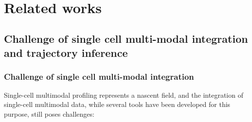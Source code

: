 \section{Related works}
\label{background:related_works}
\subsection{Challenge of single cell multi-modal integration and trajectory inference}
\label{background:sec2:challenge}

\subsubsection{Challenge of single cell multi-modal integration}
\label{background:sec2:challenge_integration}
Single-cell multimodal profiling represents a nascent field, and the integration of single-cell multimodal data, while several tools have been developed for this purpose, still poses challenges:

